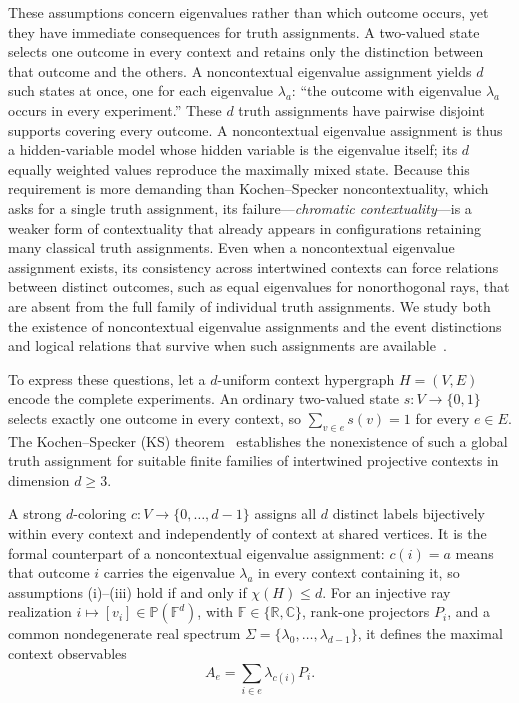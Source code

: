 \documentclass[aps,pra,reprint,superscriptaddress,longbibliography,nofootinbib,floatfix,10pt]{revtex4-2}
\theoremstyle{definition}\newtheorem{definition}[theorem]{Definition}
\theoremstyle{remark}\newtheorem{remark}[theorem]{Remark}
\newcommand{\C}{\mathbb C}\newcommand{\R}{\mathbb R}\newcommand{\Q}{\mathbb Q}
\newcommand{\F}{\mathbb F}\newcommand{\Z}{\mathbb Z}\newcommand{\PP}{\mathbb P}
\begin{document}
These assumptions concern eigenvalues rather than which outcome occurs, yet they have immediate consequences for truth assignments. A two-valued state selects one outcome in every context and retains only the distinction between that outcome and the others. A noncontextual eigenvalue assignment yields $d$ such states at once, one for each eigenvalue $\lambda_a$: ``the outcome with eigenvalue $\lambda_a$ occurs in every experiment.'' These $d$ truth assignments have pairwise disjoint supports covering every outcome. A noncontextual eigenvalue assignment is thus a hidden-variable model whose hidden variable is the eigenvalue itself; its $d$ equally weighted values reproduce the maximally mixed state. Because this requirement is more demanding than Kochen--Specker noncontextuality, which asks for a single truth assignment, its failure---\emph{chromatic contextuality}---is a weaker form of contextuality that already appears in configurations retaining many classical truth assignments. Even when a noncontextual eigenvalue assignment exists, its consistency across intertwined contexts can force relations between distinct outcomes, such as equal eigenvalues for nonorthogonal rays, that are absent from the full family of individual truth assignments. We study both the existence of noncontextual eigenvalue assignments and the event distinctions and logical relations that survive when such assignments are available~\cite{svozil-2020-c,svozil-2021-chroma,svozil-2025-color}.

To express these questions, let a $d$-uniform context hypergraph $H=(V,E)$ encode the complete experiments. An ordinary two-valued state $s:V\to\{0,1\}$ selects exactly one outcome in every context, so $\sum_{v\in e}s(v)=1$ for every $e\in E$. The Kochen--Specker (KS) theorem~\cite{kochen1} establishes the nonexistence of such a global truth assignment for suitable finite families of intertwined projective contexts in dimension $d\ge3$.

A strong $d$-coloring $c:V\to\{0,\ldots,d-1\}$ assigns all $d$ distinct labels bijectively within every context and independently of context at shared vertices. It is the formal counterpart of a noncontextual eigenvalue assignment: $c(i)=a$ means that outcome $i$ carries the eigenvalue $\lambda_a$ in every context containing it, so assumptions (i)--(iii) hold if and only if $\chi(H)\le d$. For an injective ray realization $i\mapsto[v_i]\in\PP(\F^d)$, with $\F\in\{\R,\C\}$, rank-one projectors $P_i$, and a common nondegenerate real spectrum $\Sigma=\{\lambda_0,\ldots,\lambda_{d-1}\}$, it defines the maximal context observables
\begin{equation}\label{eq:intro-maximal-obs}
A_e=\sum_{i\in e}\lambda_{c(i)}P_i.
\end{equation}
\end{document}
